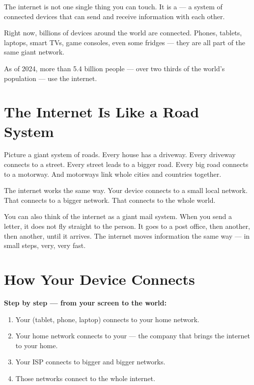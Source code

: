 The internet is not one single thing you can touch.
It is a  — a system of connected devices that can
send and receive information with each other.

Right now, billions of devices around the world are connected.
Phones, tablets, laptops, smart TVs, game consoles, even some fridges —
they are all part of the same giant network.

\begin{funfact}
As of 2024, more than 5.4 billion people — over two thirds of the world's population — use the internet.
\end{funfact}

\sectionrule

\section*{The Internet Is Like a Road System}

\begin{picturethis}
  Picture a giant system of roads.
  Every house has a driveway.
  Every driveway connects to a street.
  Every street leads to a bigger road.
  Every big road connects to a motorway.
  And motorways link whole cities and countries together.

  The internet works the same way.
  Your device connects to a small local network.
  That connects to a bigger network.
  That connects to the whole world.
\end{picturethis}

You can also think of the internet as a giant mail system.
When you send a letter, it does not fly straight to the person.
It goes to a post office, then another, then another, until it arrives.
The internet moves information the same way — in small steps, very, very fast.

\sectionrule

\section*{How Your Device Connects}

\begin{quickmap}
  \textbf{Step by step — from your screen to the world:}
  \begin{enumerate}[label=\textbf{\arabic*.}]
    \item Your  (tablet, phone, laptop) connects to your home network.
    \item Your home network connects to your  —
          the company that brings the internet to your home.
    \item Your ISP connects to bigger and bigger networks.
    \item Those networks connect to the whole internet.
  \end{enumerate}
\end{quickmap}

